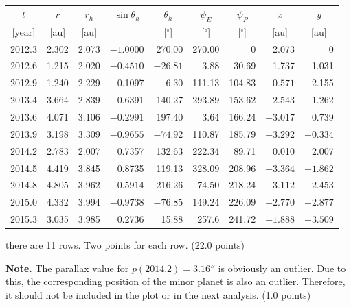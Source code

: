 \begin{description}
  \begin{center}
  \begin{tabular}{rrrrrrrrr}
    \multicolumn{1}{c}{$t$} & \multicolumn{1}{c}{$r$} &
    \multicolumn{1}{c}{$r_h$} & \multicolumn{1}{c}{$\sin\theta_h$} &
    \multicolumn{1}{c}{$\theta_h$} & \multicolumn{1}{c}{$\psi_E$} &
    \multicolumn{1}{c}{$\psi_P$} & \multicolumn{1}{c}{$x$} &
    \multicolumn{1}{c}{$y$} \\
    \multicolumn{1}{c}{[year]} & \multicolumn{1}{c}{[au]} &
    \multicolumn{1}{c}{[au]} & &
    \multicolumn{1}{c}{[$^\circ$]} & \multicolumn{1}{c}{[$^\circ$]} &
    \multicolumn{1}{c}{[$^\circ$]} & \multicolumn{1}{c}{[au]} &
    \multicolumn{1}{c}{[au]} \\
    \hline
    2012.3 & 2.302 & 2.073 & $-1.0000$ & 270.00 & 270.00 & 0 & 2.073 & 0 \\
    2012.6 & 1.215 & 2.020 & $-0.4510$ & $-26.81$ & 3.88 & 30.69 & 1.737 & 1.031 \\
    2012.9 & 1.240 & 2.229 & 0.1097 & 6.30 & 111.13 & 104.83 & $-0.571$ & 2.155 \\
    2013.4 & 3.664 & 2.839 & 0.6391 & 140.27 & 293.89 & 153.62 & $-2.543$ & 1.262 \\
    2013.6 & 4.071 & 3.106 & $-0.2991$ & 197.40 & 3.64 & 166.24 & $-3.017$ & 0.739 \\
    2013.9 & 3.198 & 3.309 & $-0.9655$ & $-74.92$ & 110.87 & 185.79 & $-3.292$ & $-0.334$ \\
    2014.2 & 2.783 & 2.007 & 0.7357 & 132.63 & 222.34 & 89.71 & 0.010 & 2.007 \\
    2014.5 & 4.419 & 3.845 & 0.8735 & 119.13 & 328.09 & 208.96 & $-3.364$ & $-1.862$ \\
    2014.8 & 4.805 & 3.962 & $-0.5914$ & 216.26 & 74.50 & 218.24 & $-3.112$ & $-2.453$ \\
    2015.0 & 4.332 & 3.994 & $-0.9738$ & $-76.85$ & 149.24 & 226.09 & $-2.770$ & $-2.877$ \\
    2015.3 & 3.035 & 3.985 & 0.2736 & 15.88 & 257.6 & 241.72 & $-1.888$ & $-3.509$ \\
    \hline
  \end{tabular}
  \end{center}

  there are 11 rows. Two points for each row. \hfill(22.0 points)

  \textbf{Note.} The parallax value for $p(2014.2) = 3.16''$ is obviously an
  outlier. Due to this, the corresponding position of the minor planet is also
  an outlier. Therefore, it should not be included in the plot or in the next
  analysis. \hfill(1.0 points)


\end{description}
